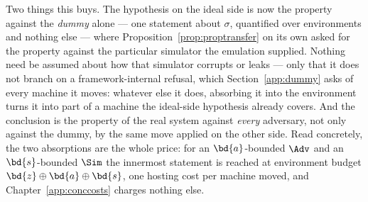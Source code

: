 \documentclass[10pt,oneside,openany]{book}
\theoremstyle{accentdef}
\theoremstyle{accentplain}
\begin{document}
Two things this buys. The hypothesis on the ideal side is now the property against the \emph{dummy}
alone --- one statement about $\sigma$, quantified over environments and nothing else --- where
Proposition~\ref{prop:proptransfer} on its own asked for the property against the particular simulator
the emulation supplied. Nothing need be assumed about how that simulator corrupts or leaks --- only that
it does not branch on a framework-internal refusal, which Section~\ref{app:dummy} asks of every
machine it moves: whatever else it does, absorbing it into the environment turns it into part of a
machine the ideal-side hypothesis already covers. And the conclusion is the property of the real system
against \emph{every} adversary, not only against the dummy, by the same move applied on the other side.
Read concretely, the two absorptions are the whole price: for an $\bd{a}$-bounded $\Adv$ and an
$\bd{s}$-bounded $\Sim$ the innermost statement is reached at environment
budget $\bd{z} \oplus \bd{a} \oplus \bd{s}$, one hosting cost per machine moved, and
Chapter~\ref{app:conccosts} charges nothing else.
\end{document}
